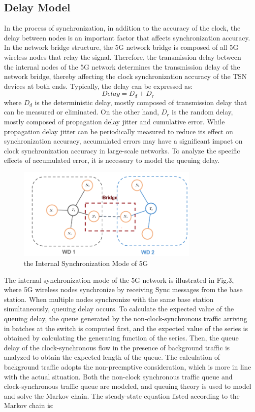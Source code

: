 \documentclass[english]{cccconf}
\begin{document}
{\subsection{Delay Model}
In the process of synchronization, in addition to the accuracy of the clock, the delay between nodes is an important factor that affects synchronization accuracy. In the network bridge structure, the 5G network bridge is composed of all 5G wireless nodes that relay the signal. Therefore, the transmission delay between the internal nodes of the 5G network determines the transmission delay of the network bridge, thereby affecting the clock synchronization accuracy of the TSN devices at both ends. Typically, the delay can be expressed as:
\begin{equation}
	Delay=D_d+D_r
\end{equation}
where $D_d$ is the deterministic delay, mostly composed of transmission delay that can be measured or eliminated. On the other hand, $D_r$ is the random delay, mostly composed of propagation delay jitter and cumulative error. While propagation delay jitter can be periodically measured to reduce its effect on synchronization accuracy\cite{9064350}, accumulated errors may have a significant impact on clock synchronization accuracy in large-scale networks. To analyze the specific effects of accumulated error, it is necessary to model the queuing delay.
\begin{figure}[htbp]
	\centering
	\setcounter{figure}{2}
	\includegraphics[width=3.5in]{fig3.png}
	\caption{the Internal Synchronization Mode of 5G }
\end{figure}
The internal synchronization mode of the 5G network is illustrated in Fig.3, where 5G wireless nodes synchronize by receiving Sync messages from the base station. When multiple nodes synchronize with the same base station simultaneously, queuing delay occurs. To calculate the expected value of the queuing delay, the queue generated by the non-clock-synchronous traffic arriving in batches at the switch is computed first, and the expected value of the series is obtained by calculating the generating function of the series. Then, the queue delay of the clock-synchronous flow in the presence of background traffic is analyzed to obtain the expected length of the queue. The calculation of background traffic adopts the non-preemptive consideration, which is more in line with the actual situation. Both the non-clock synchronous traffic queue and clock-synchronous traffic queue are modeled, and queuing theory is used to model and solve the Markov chain. The steady-state equation listed according to the Markov chain is:

}
\end{document}
